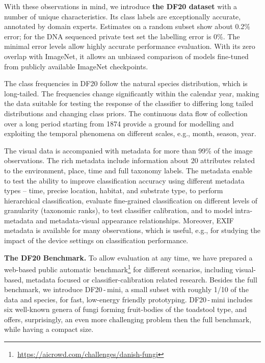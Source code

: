 \documentclass[10pt,twocolumn,letterpaper]{article}
\begin{document}
With these observations in mind, we introduce {\bf the DF20 dataset} with a number of unique characteristics. Its class labels are exceptionally accurate, annotated by domain experts. Estimates on a random subset show about 0.2\% error; for the DNA sequenced private test set the labelling error is 0\%. The minimal error levels allow highly accurate performance evaluation. 
With its zero overlap with ImageNet, it allows an unbiased comparison of models fine-tuned from publicly available ImageNet checkpoints.

The class frequencies in DF20 follow the natural species distribution, which is long-tailed. The frequencies change significantly within the calendar year, making the data suitable for testing the response of the classifier to differing long tailed distributions and changing class priors. 
The continuous data flow of collection over a long period starting from 1874 provide a ground for modelling and exploiting the temporal phenomena on different scales, e.g., month, season, year.

The visual data is accompanied with metadata for more than 99\% of the image observations. The rich metadata include information about 20 attributes related to the environment, place, time and full taxonomy labels.
The metadata enable to test the ability to improve classification accuracy using different metadata types -- time, precise location, habitat, and substrate type, to perform hierarchical classification, evaluate fine-grained classification on different levels of granularity (taxonomic ranks), to test classifier calibration, and to model intra-metadata and metadata-visual appearance relationships.
Moreover, EXIF metadata is available for many observations, which is useful, e.g., for studying the impact of the device settings on classification performance.


\textbf{The DF20 Benchmark.}
To allow evaluation at any time, we have prepared a web-based public automatic benchmark\footnote{\,\url{https://aicrowd.com/challenges/danish-fungi}} for different scenarios, including visual-based, metadata focused or classifier-calibration related research.
Besides the full benchmark, we introduce DF20\,-\,mini, a small subset with roughly 1/10 of the data and species, for fast, low-energy friendly prototyping. DF20\,-\,mini includes six well-known genera of fungi forming fruit-bodies of the toadstool type, and offers, surprisingly, an even more challenging problem then the full benchmark, while having a compact size. 
\end{document}
